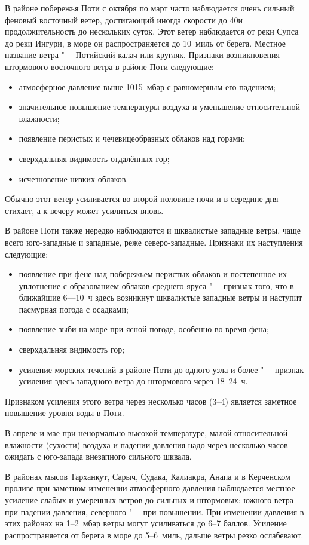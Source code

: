 В районе побережья Поти с октября по март часто наблюдается очень
сильный феновый восточный ветер, достигающий иногда скорости до
40\speedms и продолжительность до нескольких суток. Этот ветер
наблюдается от реки Супса до реки Ингури, в море он распространяется
до 10~миль от берега. Местное название ветра "--- Потийский калач или
кругляк. Признаки возникновения штормового восточного ветра в районе
Поти следующие:
\begin{itemize}
\item атмосферное давление выше 1015~мбар с равномерным его падением;
\item значительное повышение температуры воздуха и уменьшение
  относительной влажности;
\item появление перистых и чечевицеобразных облаков над горами;
\item сверхдальняя видимость отдалённых гор;
\item исчезновение низких облаков.
\end{itemize}

Обычно этот ветер усиливается во второй половине ночи и в середине дня
стихает, а к вечеру может усилиться вновь.

В районе Поти также нередко наблюдаются и шквалистые западные ветры,
чаще всего юго-западные и западные, реже северо-западные. Признаки их наступления следующие:
\begin{itemize}
\item появление при фене над побережьем перистых облаков и постепенное
  их уплотнение с образованием облаков среднего яруса "--- признак
  того, что в ближайшие 6---10~ч здесь возникнут шквалистые западные
  ветры и наступит пасмурная погода с осадками;
\item появление зыби на море при ясной погоде, особенно во время фена;
\item сверхдальняя видимость гор;
\item усиление морских течений в районе Поти до одного узла и более
  "--- признак усиления здесь западного ветра до штормового через
  18--24~ч.
\end{itemize}

Признаком усиления этого ветра через несколько часов (3--4) является
заметное повышение уровня воды в Поти.

В апреле и мае при ненормально высокой температуре, малой
относительной влажности (сухости) воздуха и падении давления надо
через несколько часов ожидать с юго-запада внезапного сильного шквала.

В районах мысов Тарханкут, Сарыч, Судака, Калиакра, Анапа и в
Керченском проливе при заметном изменении атмосферного давления
наблюдается местное усиление слабых и умеренных ветров до сильных и
штормовых: южного ветра при падении давления, северного "--- при
повышении. При изменении давления в этих районах на 1--2~мбар ветры
могут усиливаться до 6--7 баллов. Усиление распространяется от берега в
море до 5--6~миль, дальше ветры резко ослабевают.

